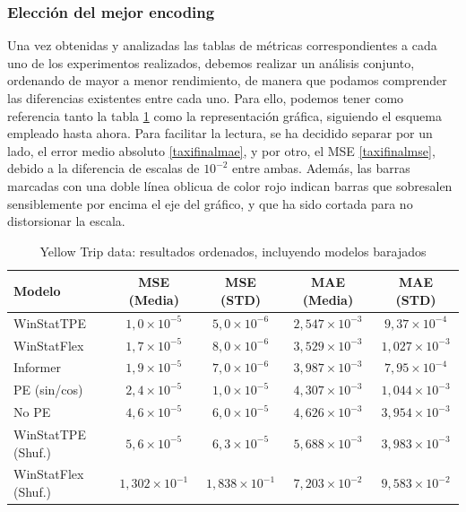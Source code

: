 \subsubsection{Elección del mejor encoding}

Una vez obtenidas y analizadas las tablas de métricas correspondientes a cada uno de los experimentos realizados, debemos realizar un análisis conjunto, ordenando de mayor a menor rendimiento, de manera que podamos comprender las diferencias existentes entre cada uno. Para ello, podemos tener como referencia tanto la tabla \ref{taxifinal} como la representación gráfica, siguiendo el esquema empleado hasta ahora. Para facilitar la lectura, se ha decidido separar por un lado, el error medio absoluto \ref{taxifinalmae}, y por otro, el MSE \ref{taxifinalmse}, debido a la diferencia de escalas de $10^{-2}$ entre ambas. Además, las barras marcadas con una doble línea oblicua de color rojo indican barras que sobresalen sensiblemente por encima el eje del gráfico, y que ha sido cortada para no distorsionar la escala.\\


\begin{table}[!ht]
	\centering
	\begin{tabular}{l|c|c|c|c}
		\toprule
		Modelo & MSE (Media) & MSE (STD) & MAE (Media) & MAE (STD) \\
		\midrule
		WinStatTPE & $1,0 \times 10^{-5}$ & $5,0 \times 10^{-6}$ & $2,547 \times 10^{-3}$ & $9,37 \times 10^{-4}$ \\
		WinStatFlex & $1,7 \times 10^{-5}$ & $8,0 \times 10^{-6}$ & $3,529 \times 10^{-3}$ & $1,027 \times 10^{-3}$ \\
		Informer & $1,9 \times 10^{-5}$ & $7,0 \times 10^{-6}$ & $3,987 \times 10^{-3}$ & $7,95 \times 10^{-4}$ \\
		PE (sin/cos) & $2,4 \times 10^{-5}$ & $1,0 \times 10^{-5}$ & $4,307 \times 10^{-3}$ & $1,044 \times 10^{-3}$ \\
		No PE & $4,6 \times 10^{-5}$ & $6,0 \times 10^{-5}$ & $4,626 \times 10^{-3}$ & $3,954 \times 10^{-3}$ \\
		WinStatTPE (Shuf.) & $5,6 \times 10^{-5}$ & $6,3 \times 10^{-5}$ & $5,688 \times 10^{-3}$ & $3,983 \times 10^{-3}$ \\
		WinStatFlex (Shuf.) & $1,302 \times 10^{-1}$ & $1,838 \times 10^{-1}$ & $7,203 \times 10^{-2}$ & $9,583 \times 10^{-2}$ \\
		\bottomrule
	\end{tabular}
	\caption{Yellow Trip data: resultados ordenados, incluyendo modelos barajados}
	\label{taxifinal}
\end{table}



